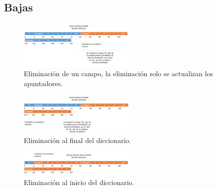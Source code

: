 \subsection{Bajas}
\begin{figure}[!ht]
\begin{center}
  \includegraphics[width=0.5\textwidth]{secciones/ejemploA/Elimina1.png}
  \caption{Eliminación de un campo, la eliminación solo se actualizan los apuntadores.}
\end{center}
\end{figure}
\begin{figure}[!ht]
\begin{center}
  \includegraphics[width=0.5\textwidth]{secciones/ejemploA/Elimina2.png}
  \caption{Eliminación al final del diccionario.}
\end{center}
\end{figure}
\begin{figure}[!ht]
\begin{center}
  \includegraphics[width=0.5\textwidth]{secciones/ejemploA/Elimina3.png}
  \caption{Eliminación al inicio del diccionario.}
\end{center}
\end{figure}

\newpage
